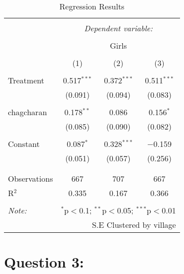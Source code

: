 \documentclass[
]{article}
\begin{document}
\begin{table}[!htbp] \centering 
  \caption{Regression Results} 
  \label{} 
\begin{tabular}{@{\extracolsep{5pt}}lccc} 
\\[-1.8ex]\hline 
\hline \\[-1.8ex] 
 & \multicolumn{3}{c}{\textit{Dependent variable:}} \\ 
\cline{2-4} 
\\[-1.8ex] & \multicolumn{3}{c}{Girls} \\ 
\\[-1.8ex] & (1) & (2) & (3)\\ 
\hline \\[-1.8ex] 
 Treatment & 0.517$^{***}$ & 0.372$^{***}$ & 0.511$^{***}$ \\ 
  & (0.091) & (0.094) & (0.083) \\ 
  & & & \\ 
 chagcharan & 0.178$^{**}$ & 0.086 & 0.156$^{*}$ \\ 
  & (0.085) & (0.090) & (0.082) \\ 
  & & & \\ 
 Constant & 0.087$^{*}$ & 0.328$^{***}$ & $-$0.159 \\ 
  & (0.051) & (0.057) & (0.256) \\ 
  & & & \\ 
\hline \\[-1.8ex] 
Observations & 667 & 707 & 667 \\ 
R$^{2}$ & 0.335 & 0.167 & 0.366 \\ 
\hline 
\hline \\[-1.8ex] 
\textit{Note:}  & \multicolumn{3}{r}{$^{*}$p$<$0.1; $^{**}$p$<$0.05; $^{***}$p$<$0.01} \\ 
 & \multicolumn{3}{r}{S.E Clustered by village} \\ 
\end{tabular} 
\end{table}

\hypertarget{question-3}{%
\section{Question 3:}\label{question-3}}
\end{document}
